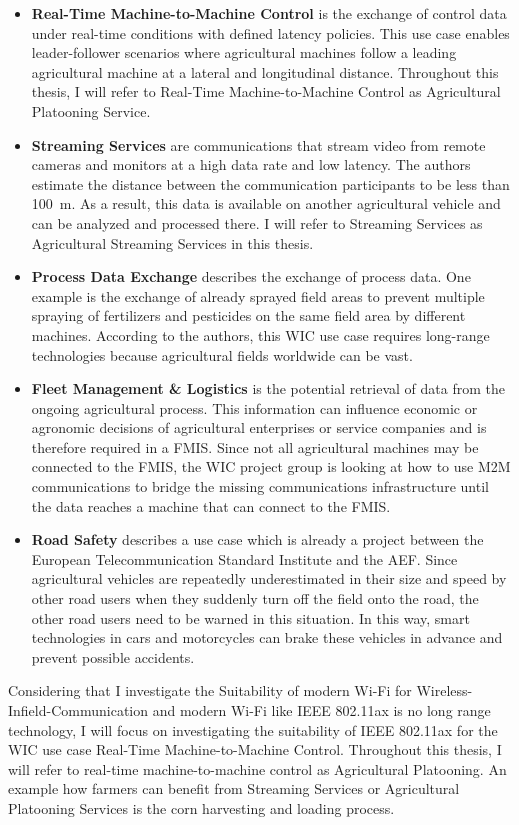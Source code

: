 \begin{itemize}
	\item \textbf{Real-Time Machine-to-Machine Control} is the exchange of control data under real-time conditions with defined latency policies. This use case enables leader-follower scenarios where agricultural machines follow a leading agricultural machine at a lateral and longitudinal distance. Throughout this thesis, I will refer to Real-Time Machine-to-Machine Control as Agricultural Platooning Service.
	\item \textbf{Streaming Services} are communications that stream video from remote cameras and monitors at a high data rate and low latency. The authors estimate the distance between the communication participants to be less than \SI{100}{\metre}. As a result, this data is available on another agricultural vehicle and can be analyzed and processed there.
	I will refer to Streaming Services as Agricultural Streaming Services in this thesis. %
	\item \textbf{Process Data Exchange} describes the exchange of process data. One example is the exchange of already sprayed field areas to prevent multiple spraying of fertilizers and pesticides on the same field area by different machines. According to the authors, this \ac{WIC} use case requires long-range technologies because agricultural fields worldwide can be vast.
	\item \textbf{Fleet Management \& Logistics} is the potential retrieval of data from the ongoing agricultural process. This information can influence economic or agronomic decisions of agricultural enterprises or service companies and is therefore required in a \ac{FMIS}.
	Since not all agricultural machines may be connected to the \ac{FMIS}, the \ac{WIC} project group is looking at how to use \ac{M2M} communications to bridge the missing communications infrastructure until the data reaches a machine that can connect to the \ac{FMIS}.
	\item \textbf{Road Safety} describes a use case which is already a project between the European Telecommunication Standard Institute and the \ac{AEF}. Since agricultural vehicles are repeatedly underestimated in their size and speed by other road users when they suddenly turn off the field onto the road, the other road users need to be warned in this situation. In this way, smart technologies in cars and motorcycles can brake these vehicles in advance and prevent possible accidents.
\end{itemize}

Considering that I investigate the Suitability of modern Wi-Fi for Wireless-Infield-Communication and modern Wi-Fi like IEEE 802.11ax is no long range technology,
I will focus on investigating the suitability of IEEE 802.11ax for the \ac{WIC} use case Real-Time Machine-to-Machine Control.
Throughout this thesis, I will refer to real-time machine-to-machine control as Agricultural Platooning.
An example how farmers can benefit from Streaming Services or Agricultural Platooning Services is the corn harvesting and loading process.
